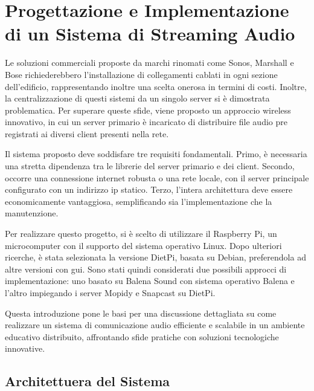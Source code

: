 
%

\chapter{Progettazione e Implementazione di un Sistema di Streaming Audio}
\label{cha:streamingaudio}


Le soluzioni commerciali proposte da marchi rinomati come Sonos, Marshall e Bose richiederebbero l'installazione di collegamenti cablati in ogni sezione dell'edificio, rappresentando inoltre una scelta onerosa in termini di costi. Inoltre, la centralizzazione di questi sistemi da un singolo server si è dimostrata problematica. Per superare queste sfide, viene proposto un approccio wireless innovativo, in cui un server primario è incaricato di distribuire file audio pre registrati ai diversi client presenti nella rete.

Il sistema proposto deve soddisfare tre requisiti fondamentali. Primo, è necessaria una stretta dipendenza tra le librerie del server primario e dei client. Secondo, occorre una connessione internet robusta o una rete locale, con il server principale configurato con un indirizzo \gls{ip} statico. Terzo, l'intera architettura deve essere economicamente vantaggiosa, semplificando sia l'implementazione che la manutenzione.

Per realizzare questo progetto, si è scelto di utilizzare il Raspberry Pi, un microcomputer con il supporto del sistema operativo Linux. Dopo ulteriori ricerche, è stata selezionata la versione DietPi, basata su Debian, preferendola ad altre versioni con \gls{gui}. Sono stati quindi considerati due possibili approcci di implementazione: uno basato su Balena Sound con sistema operativo Balena e l'altro impiegando i server Mopidy e Snapcast su DietPi.

Questa introduzione pone le basi per una discussione dettagliata su come realizzare un sistema di comunicazione audio efficiente e scalabile in un ambiente educativo distribuito, affrontando sfide pratiche con soluzioni tecnologiche innovative.

\newpage
\section{Architettuera del Sistema}
\noindent

